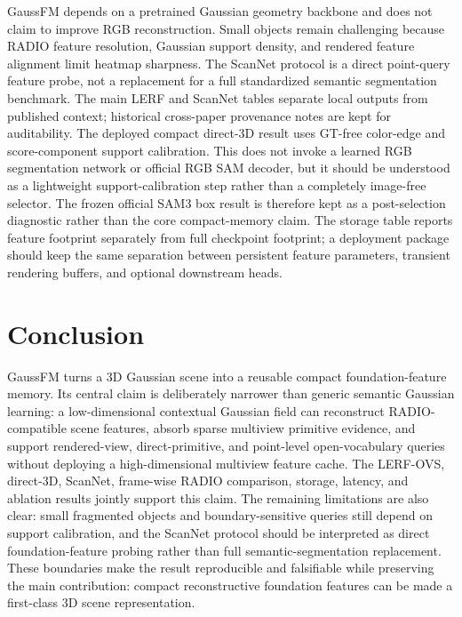 \documentclass[journal,twoside]{IEEEtran}
\newcommand{\method}{GaussFM}
\begin{document}
\method{} depends on a pretrained Gaussian geometry backbone and does not claim
to improve RGB reconstruction. Small objects remain challenging because RADIO
feature resolution, Gaussian support density, and rendered feature alignment
limit heatmap sharpness. The ScanNet protocol is a direct point-query feature
probe, not a replacement for a full standardized semantic segmentation
benchmark. The main LERF and ScanNet tables separate local outputs from
published context; historical cross-paper provenance notes are kept for
auditability. The deployed compact direct-3D result uses GT-free color-edge
and score-component support calibration. This does not invoke a learned RGB
segmentation network or official RGB SAM decoder, but it should be understood as
a lightweight support-calibration step rather than a completely image-free
selector. The frozen official SAM3 box result is therefore kept as a
post-selection diagnostic rather than the core compact-memory claim. The storage
table reports feature footprint separately from full checkpoint footprint; a
deployment package should keep the same separation between persistent feature
parameters, transient rendering buffers, and optional downstream heads.

\section{Conclusion}

\method{} turns a 3D Gaussian scene into a reusable compact foundation-feature
memory. Its central claim is deliberately narrower than generic semantic
Gaussian learning: a low-dimensional contextual Gaussian field can reconstruct
RADIO-compatible scene features, absorb sparse multiview primitive evidence, and
support rendered-view, direct-primitive, and point-level open-vocabulary
queries without deploying a high-dimensional multiview feature cache. The
LERF-OVS, direct-3D, ScanNet, frame-wise RADIO comparison, storage, latency, and
ablation results jointly support this claim. The remaining limitations are also
clear: small fragmented objects and boundary-sensitive queries still depend on
support calibration, and the ScanNet protocol should be interpreted as direct
foundation-feature probing rather than full semantic-segmentation replacement.
These boundaries make the result reproducible and falsifiable while preserving
the main contribution: compact reconstructive foundation features can be made a
first-class 3D scene representation.



\end{document}
